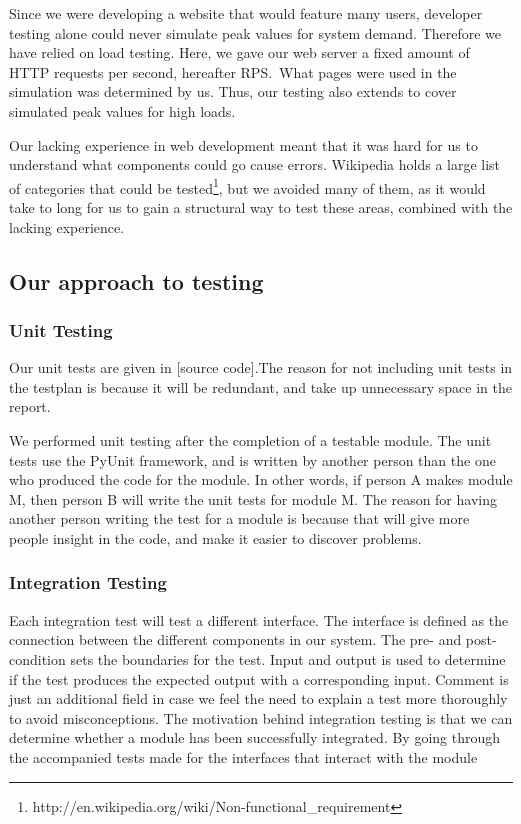 Since we were developing a website that would feature many users,
developer testing alone could never simulate peak values for system
demand. Therefore we have relied on load testing. Here, we gave our web
server a fixed amount of HTTP requests per second, hereafter RPS.\ What
pages were used in the simulation was determined by us. Thus, our
testing also extends to cover simulated peak values for high loads.


Our lacking experience in web development meant that it was hard for us
to understand what components could go cause errors. Wikipedia holds a
large list of categories that could be
tested\footnote{http://en.wikipedia.org/wiki/Non-functional\_requirement},
but we avoided many of them, as it would take to long for us to gain a
structural way to test these areas, combined with the lacking
experience. 

\subsection{Our approach to testing}
\subsubsection{Unit Testing}
Our unit tests are given in [source code].The reason for not including
unit tests in the testplan is because it will be redundant, and take up
unnecessary space in the report.

We performed unit testing after the completion of a testable module. The
unit tests use the PyUnit framework, and is written by another person
than the one who produced the code for the module. In other words, if
person A makes module M, then person B will write the unit tests for
module M. The reason for having another person writing the test for a
module is because that will give more people insight in the code, and
make it easier to discover problems.

\subsubsection{Integration Testing}
Each integration test will test a different interface. The interface is
defined as the connection between the different components in our
system. The pre- and post-condition sets the boundaries for the test.
Input and output is used to determine if the test produces the expected
output with a corresponding input. Comment is just an additional field
in case we feel the need to explain a test more thoroughly to avoid
misconceptions. The motivation behind integration testing is that we
can determine whether a module has been successfully integrated. By
going through the accompanied tests made for the interfaces that
interact with the module


